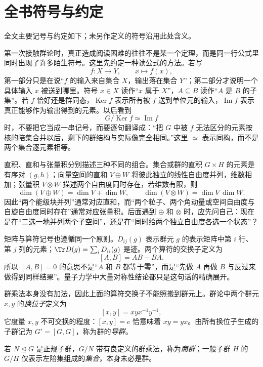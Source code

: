 \chapter*{全书符号与约定}

全文主要记号与约定如下；未另作定义的符号沿用此处含义。


第一次接触群论时，真正造成阅读困难的往往不是某一个定理，而是同一行公式里同时出现了许多陌生符号。这里先约定一种读公式的方法。若写
\[
f:X\longrightarrow Y,\qquad x\longmapsto f(x),
\]
第一部分只是在说“$f$ 的输入来自集合 $X$，输出落在集合 $Y$”；第二部分才说明一个具体输入 $x$ 被送到哪里。符号 $x\in X$ 读作“$x$ 属于 $X$”，$A\subseteq B$ 读作“$A$ 是 $B$ 的子集”。若 $f$ 恰好还是群同态，$\operatorname{Ker} f$ 表示所有被 $f$ 送到单位元的输入，$\operatorname{Im} f$ 表示真正能够作为输出得到的元素。以后看到
\[
G/\operatorname{Ker} f\simeq \operatorname{Im} f
\]
时，不要把它当成一串记号，而要逐句翻译成：“把 $G$ 中被 $f$ 无法区分的元素按核的陪集合并以后，剩下的群结构与实际像完全相同。”这里 $\simeq$ 表示同构，而不是两个集合逐元素相等。

直积、直和与张量积分别描述三种不同的组合。集合或群的直积 $G\times H$ 的元素是有序对 $(g,h)$；向量空间的直和 $V\oplus W$ 将彼此独立的线性自由度并列，维数相加；张量积 $V\otimes W$ 描述两个自由度同时存在，若维数有限，则
\[
\dim(V\oplus W)=\dim V+\dim W,
\qquad
\dim(V\otimes W)=\dim V\,\dim W.
\]
因此“两个能级块并列”通常对应直和，而“两个粒子、两个角动量或空间自由度与自旋自由度同时存在”通常对应张量积。后面遇到 $\oplus$ 和 $\otimes$ 时，应先问自己：现在是在“二选一地并列两个子空间”，还是在“同时给两个独立自由度各选一个状态”？

矩阵与算符记号也遵循同一个原则。$D_{ij}(g)$ 表示群元 $g$ 的表示矩阵中第 $i$ 行、第 $j$ 列的元素；$\Tr D(g)=\sum_iD_{ii}(g)$ 是迹。两个算符的交换子定义为
\[
[A,B]=AB-BA.
\]
所以 $[A,B]=0$ 的意思不是“$A$ 和 $B$ 都等于零”，而是“先做 $A$ 再做 $B$ 与反过来做得到同样结果”。量子力学中大量对称性结论都只是这句话的精确展开。

群乘法本身没有加法，因此上面的算符交换子不能照搬到群元上。群论中两个群元 $x,y$ 的\emph{换位子}定义为
\[
[x,y]=xyx^{-1}y^{-1},
\]
它度量 $x,y$ 不可交换的程度：$[x,y]=e$ 恰意味着 $xy=yx$。由所有换位子生成的子群记为 $G'=[G,G]$，称为群的\emph{导群}。

若 $N\mathrel{\trianglelefteq} G$ 是正规子群，$G/N$ 带有良定义的群乘法，称为\emph{商群}；一般子群 $H$ 的 $G/H$ 仅表示左陪集组成的\emph{集合}，本身未必是群。

